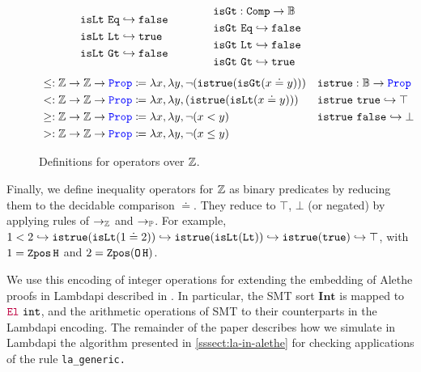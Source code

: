 \begin{figure}
\[\begin{array}{l@{\hspace{4em}}l@{\hspace{4em}}l}
\begin{aligned}
  &\tt{isLt}~\tt{Eq} \re \tt{false} \\
  &\tt{isLt}~\tt{Lt} \re \tt{true} \\
  &\tt{isLt}~\tt{Gt} \re \tt{false} \\
\end{aligned}
&
\begin{aligned}
  &\tt{isGt} : \tt{Comp} \ra \bb{B} \\
  &\tt{isGt}~\tt{Eq} \re \tt{false} \\
  &\tt{isGt}~\tt{Lt} \re \tt{false} \\
  &\tt{isGt}~\tt{Gt} \re \tt{true} 
\end{aligned}
\end{array}
\]
\noindent
\begin{align*}
&\leq: \bb{Z} \ra \bb{Z} \ra \prop  \coloneq \lambda x,\lambda y, \neg (\tt{istrue}(\tt{isGt}(x \doteq y))) & &\tt{istrue} : \bb{B} \ra \prop \\
&<: \bb{Z} \ra \bb{Z} \ra \prop  \coloneq \lambda x,\lambda y, (\tt{istrue}(\tt{isLt}(x \doteq y))) & &\tt{istrue}~\tt{true} \re \top \\
&\geq: \bb{Z} \ra \bb{Z} \ra \prop  \coloneq \lambda x,\lambda y, \neg (x < y) & &\tt{istrue}~\tt{false} \re \bot \\
&>: \bb{Z} \ra \bb{Z} \ra \prop  \coloneq \lambda x,\lambda y, \neg (x \leq y) & &
\end{align*}
\caption{Definitions for operators over $\bb{Z}$.}
\label{fig:arith-ops}
\end{figure}

Finally, we define inequality operators for $\bb{Z}$ as binary predicates by reducing them to the decidable comparison $\doteq$. They reduce to $\top$, $\bot$ (or negated) by applying rules of $\ra_\bb{Z}$ and $\ra_\bb{P}$.
For example, $1 < 2 \hookrightarrow \tt{istrue}(\tt{isLt}(1 \doteq 2)) \hookrightarrow \tt{istrue}(\tt{isLt}(\tt{Lt})) \hookrightarrow \tt{istrue}(\tt{true}) \hookrightarrow \top$, with $1 = \mathop{\tt{Zpos}} \tt{H}$ and $2 = \mathop{\tt{Zpos}} (\mathop{\tt{O}} \tt{H})$.

We use this encoding of integer operations for extending the embedding of Alethe proofs in Lambdapi described in \cite{ColtellacciMD24}. In particular, the SMT sort $\textbf{Int}$ is mapped to $\el~\texttt{int}$, and the arithmetic operations of SMT to their counterparts in the Lambdapi encoding. The remainder of the paper describes how we simulate in Lambdapi the algorithm presented in \cref{sssect:la-in-alethe} for checking applications of the rule \tt{la\_generic}.

